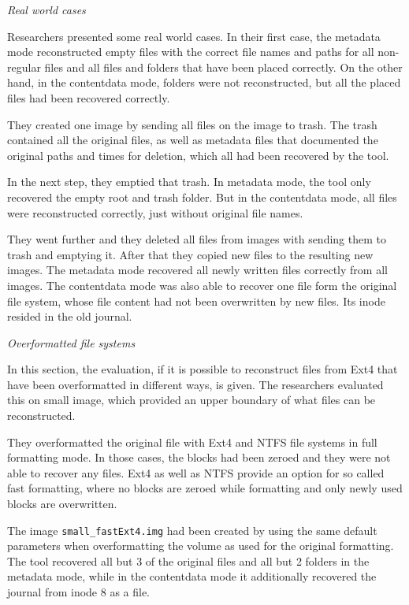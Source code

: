 \documentclass{acm_proc_article-sp}
\begin{document}
\textit{Real world cases}

Researchers presented some real world cases. In their first case, the metadata mode reconstructed empty files with the correct file names and paths for all non-regular files and all files and folders that have been
placed correctly. On the other hand, in the contentdata mode, folders were not reconstructed, but all the placed files had been recovered correctly.

They created one image by sending all files on the image to trash. The trash contained all the original files, as well as metadata files that documented the original paths and times for deletion, which all had been recovered by the tool.

In the next step, they emptied that trash. In metadata mode, the tool only recovered the empty root and trash folder. But in the contentdata mode, all files were reconstructed correctly, just without original file names. 

They went further and they deleted all files from images with sending them to trash and emptying it. After that they copied new files to the resulting new images. The metadata mode recovered all newly written files correctly from all images. The contentdata mode was also able to recover one file form the original file system, whose file content had not been overwritten by new files. Its inode resided in the old journal.


\textit{Overformatted file systems}

In this section, the evaluation, if it is possible to reconstruct files from Ext4 that have been overformatted in different ways, is given. The researchers evaluated this on small image, which provided an upper boundary of what files can be reconstructed.

They overformatted the original file with Ext4 and NTFS file systems in full formatting mode. In those cases, the blocks had been zeroed and they were not able to recover any files. Ext4 as well as NTFS provide an option for so called fast formatting, where no blocks are zeroed while formatting and only newly used blocks are overwritten.

The image \texttt{small\_fastExt4.img} 
 had been created by using the same default parameters when overformatting the volume as used for the original formatting. The tool recovered all but 3 of the original files and all but 2 folders in the metadata mode, while in the contentdata mode it additionally recovered the journal from inode 8 as a file.
\end{document}
